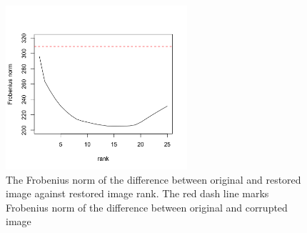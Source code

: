\documentclass[12pt]{article}
\begin{document}
	\begin{figure}[!htbp]
		\centering
		\includegraphics[width=0.6\textwidth]{norm2rank}
		\caption{The Frobenius norm of the difference between original and restored image against restored image rank. The red dash line marks Frobenius norm of the difference between original and corrupted image}
		\label{fig:norm}
	\end{figure}
	
\end{document}
